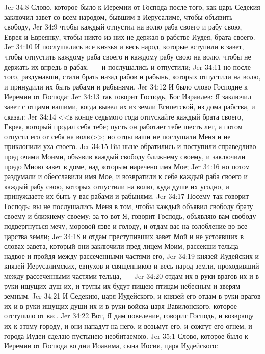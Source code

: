 \vs Jer 34:8 Слово, которое было к Иеремии от Господа после того, как царь Седекия заключил завет со всем народом, бывшим в Иерусалиме, чтобы объявить свободу,
\vs Jer 34:9 чтобы каждый отпустил на волю раба своего и рабу свою, Еврея и Евреянку, чтобы никто из них не держал в рабстве Иудея, брата своего.
\vs Jer 34:10 И послушались все князья и весь народ, которые вступили в завет, чтобы отпустить каждому раба своего и каждому рабу свою на волю, чтобы не держать их впредь в рабах,~--- и послушались и отпустили;
\vs Jer 34:11 но после того, раздумавши, стали брать назад рабов и рабынь, которых отпустили на волю, и принудили их быть рабами и рабынями.
\rsbpar\vs Jer 34:12 И было слово Господне к Иеремии от Господа:
\vs Jer 34:13 так говорит Господь, Бог Израилев: Я заключил завет с отцами вашими, когда вывел их из земли Египетской, из дома рабства, и сказал:
\vs Jer 34:14 <<в конце седьмого года отпускайте каждый брата своего, Еврея, который продал себя тебе; пусть он работает тебе шесть лет, а потом отпусти его от себя на волю>>; но отцы ваши не послушали Меня и не приклонили уха своего.
\vs Jer 34:15 Вы ныне обратились и поступили справедливо пред очами Моими, объявив каждый свободу ближнему своему, и заключили предо Мною завет в доме, над которым наречено имя Мое;
\vs Jer 34:16 но потом раздумали и обесславили имя Мое, и возвратили к себе каждый раба своего и каждый рабу свою, которых отпустили на волю, куда душе их угодно, и принуждаете их быть у вас рабами и рабынями.
\vs Jer 34:17 Посему так говорит Господь: вы не послушались Меня в том, чтобы каждый объявил свободу брату своему и ближнему своему; за то вот Я, говорит Господь, объявляю вам свободу подвергнуться мечу, моровой язве и голоду, и отдам вас на озлобление во все царства земли;
\vs Jer 34:18 и отдам преступивших завет Мой и не устоявших в словах завета, который они заключили пред лицем Моим, рассекши тельца надвое и пройдя между рассеченными частями его,
\vs Jer 34:19 князей Иудейских и князей Иерусалимских, евнухов и священников и весь народ земли, проходивший между рассеченными частями тельца,~---
\vs Jer 34:20 отдам их в руки врагов их и в руки ищущих душ их, и трупы их будут пищею птицам небесным и зверям земным.
\vs Jer 34:21 И Седекию, царя Иудейского, и князей его отдам в руки врагов их и в руки ищущих души их и в руки войска царя Вавилонского, которое отступило от вас.
\vs Jer 34:22 Вот, Я дам повеление, говорит Господь, и возвращу их к этому городу, и они нападут на него, и возьмут его, и сожгут его огнем, и города Иудеи сделаю пустынею необитаемою.
\vs Jer 35:1 Слово, которое было к Иеремии от Господа во дни Иоакима, сына Иосии, царя Иудейского:
